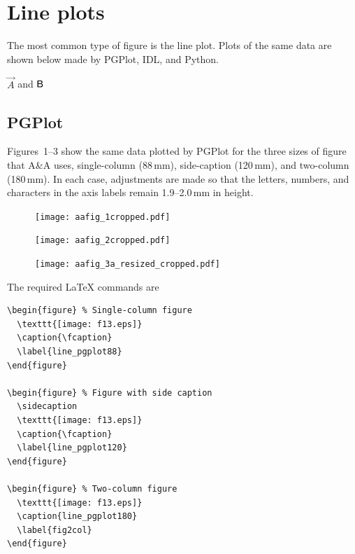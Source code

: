 \documentclass[traditabstract]{aa}
\begin{document}
\section{Line plots}

The most common type of figure is the line plot.  Plots of the same data are shown below made by PGPlot, IDL, and Python.  


$\vec{A}$ and
$\mathsf{B}$


\subsection{PGPlot}

Figures~1--3 show the same data plotted by PGPlot for the three sizes of figure that A\&A uses, single-column (88\,mm), side-caption (120\,mm), and two-column (180\,mm).  In each case, adjustments are made so that the letters, numbers, and characters in the axis labels remain 1.9--2.0\,mm in height.



\begin{figure} 
  \texttt{[image: aafig\_1cropped.pdf]}
  \caption{\fcaption} 
  \label{line_pgplot88}
\end{figure}



\begin{figure} 
  \sidecaption
  \texttt{[image: aafig\_2cropped.pdf]} 
  \caption{\fcaption} 
  \label{line_pgplot120}
\end{figure}



\begin{figure} 
  \texttt{[image: aafig\_3a\_resized\_cropped.pdf]}
  \caption{\fcaption} 
  \label{line_pgplot180}
\end{figure}

The required LaTeX commands are

\begin{verbatim}
\begin{figure} % Single-column figure
  \texttt{[image: f13.eps]}
  \caption{\fcaption} 
  \label{line_pgplot88}
\end{figure}

\begin{figure} % Figure with side caption
  \sidecaption
  \texttt{[image: f13.eps]} 
  \caption{\fcaption} 
  \label{line_pgplot120}
\end{figure}

\begin{figure} % Two-column figure
  \texttt{[image: f13.eps]}
  \caption{line_pgplot180} 
  \label{fig2col}
\end{figure}
\end{verbatim}
\end{document}
